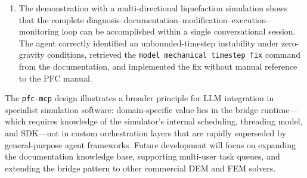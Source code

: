 \begin{enumerate}
  \item The demonstration with a multi-directional liquefaction simulation shows that the complete diagnosis--documentation--modification--execution--monitoring loop can be accomplished within a single conversational session. The agent correctly identified an unbounded-timestep instability under zero-gravity conditions, retrieved the \texttt{model mechanical timestep fix} command from the documentation, and implemented the fix without manual reference to the PFC manual.

\end{enumerate}

The \texttt{pfc-mcp} design illustrates a broader principle for LLM integration in specialist simulation software: domain-specific value lies in the bridge runtime---which requires knowledge of the simulator's internal scheduling, threading model, and SDK---not in custom orchestration layers that are rapidly superseded by general-purpose agent frameworks. Future development will focus on expanding the documentation knowledge base, supporting multi-user task queues, and extending the bridge pattern to other commercial DEM and FEM solvers.

